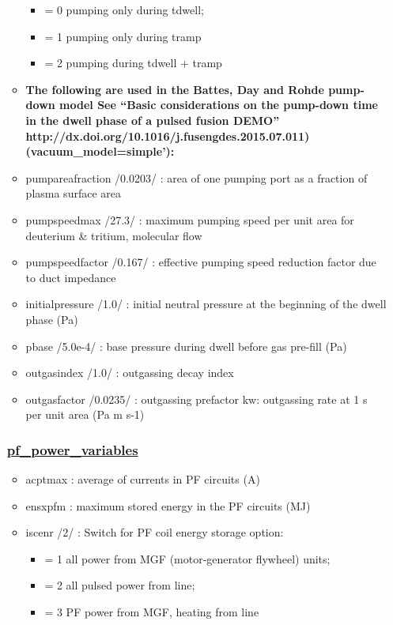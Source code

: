 \documentclass[]{article}
\providecommand{\tightlist}{%
  \setlength{\itemsep}{0pt}\setlength{\parskip}{0pt}}
\begin{document}
\begin{itemize}
\begin{itemize}
    \begin{itemize}
    \tightlist
    \item
      = 0 pumping only during tdwell;
    \item
      = 1 pumping only during tramp
    \item
      = 2 pumping during tdwell + tramp
    \end{itemize}
  \item
    \textbf{The following are used in the Battes, Day and Rohde
    pump-down model See ``Basic considerations on the pump-down time in
    the dwell phase of a pulsed fusion DEMO''
    http://dx.doi.org/10.1016/j.fusengdes.2015.07.011)
    (vacuum\_model=simple'):}
  \item
    pumpareafraction /0.0203/ : area of one pumping port as a fraction
    of plasma surface area
  \item
    pumpspeedmax /27.3/ : maximum pumping speed per unit area for
    deuterium \& tritium, molecular flow
  \item
    pumpspeedfactor /0.167/ : effective pumping speed reduction factor
    due to duct impedance
  \item
    initialpressure /1.0/ : initial neutral pressure at the beginning of
    the dwell phase (Pa)
  \item
    pbase /5.0e-4/ : base pressure during dwell before gas pre-fill (Pa)
  \item
    outgasindex /1.0/ : outgassing decay index
  \item
    outgasfactor /0.0235/ : outgassing prefactor kw: outgassing rate at
    1 s per unit area (Pa m s-1)
  \end{itemize}

  \subsubsection{\texorpdfstring{\href{pf_power_variables.html}{pf\_power\_variables}}{pf\_power\_variables}}\label{pf_power_variables}

  \begin{itemize}
  \tightlist
  \item
    acptmax : average of currents in PF circuits (A)
  \item
    ensxpfm : maximum stored energy in the PF circuits (MJ)
  \item
    iscenr /2/ : Switch for PF coil energy storage option:

    \begin{itemize}
    \tightlist
    \item
      = 1 all power from MGF (motor-generator flywheel) units;
    \item
      = 2 all pulsed power from line;
    \item
      = 3 PF power from MGF, heating from line
    \end{itemize}


\end{itemize}
\end{itemize}
\end{document}
